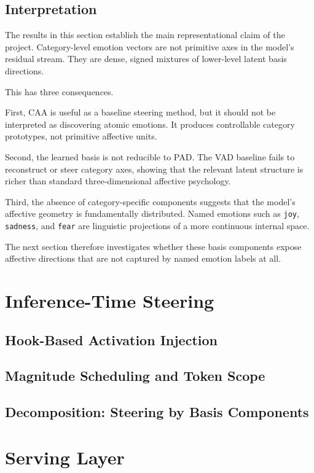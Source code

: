 \documentclass[12pt,twoside]{report}
\begin{document}
\subsection{Interpretation}
\label{sec:emotion_code:caa_basis_decomposition:interpretation}

The results in this section establish the main representational claim of the project. Category-level emotion vectors are not primitive axes in the model's residual stream. They are dense, signed mixtures of lower-level latent basis directions.

This has three consequences.

First, CAA is useful as a baseline steering method, but it should not be interpreted as discovering atomic emotions. It produces controllable category prototypes, not primitive affective units.

Second, the learned basis is not reducible to PAD. The VAD baseline fails to reconstruct or steer category axes, showing that the relevant latent structure is richer than standard three-dimensional affective psychology.

Third, the absence of category-specific components suggests that the model's affective geometry is fundamentally distributed. Named emotions such as \texttt{joy}, \texttt{sadness}, and \texttt{fear} are linguistic projections of a more continuous internal space.

The next section therefore investigates whether these basis components expose affective directions that are not captured by named emotion labels at all.

\section{Inference-Time Steering}
  \subsection{Hook-Based Activation Injection}    %
  \subsection{Magnitude Scheduling and Token Scope}
  \subsection{Decomposition: Steering by Basis Components}

\section{Serving Layer}
\end{document}

